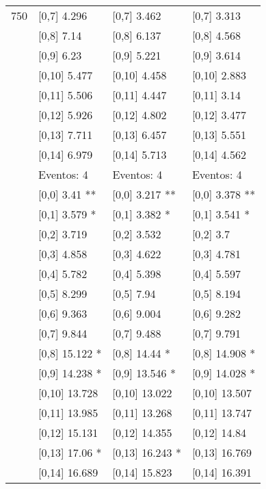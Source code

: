 \begin{table}
\begin{tabular}[t]{llll}
750 & {}[0,7] 4.296 & {}[0,7] 3.462 & {}[0,7] 3.313\\
\addlinespace
 & {}[0,8] 7.14 & {}[0,8] 6.137 & {}[0,8] 4.568\\
 & {}[0,9] 6.23 & {}[0,9] 5.221 & {}[0,9] 3.614\\
 & {}[0,10] 5.477 & {}[0,10] 4.458 & {}[0,10] 2.883\\
 & {}[0,11] 5.506 & {}[0,11] 4.447 & {}[0,11] 3.14\\
 & {}[0,12] 5.926 & {}[0,12] 4.802 & {}[0,12] 3.477\\
\addlinespace
 & {}[0,13] 7.711 & {}[0,13] 6.457 & {}[0,13] 5.551\\
 & {}[0,14] 6.979 & {}[0,14] 5.713 & {}[0,14] 4.562\\
 & Eventos:  4 & Eventos:  4 & Eventos:  4\\
 & {}[0,0] 3.41 ** & {}[0,0] 3.217 ** & {}[0,0] 3.378 **\\
 & {}[0,1] 3.579 * & {}[0,1] 3.382 * & {}[0,1] 3.541 *\\
\addlinespace
 & {}[0,2] 3.719 & {}[0,2] 3.532 & {}[0,2] 3.7\\
 & {}[0,3] 4.858 & {}[0,3] 4.622 & {}[0,3] 4.781\\
 & {}[0,4] 5.782 & {}[0,4] 5.398 & {}[0,4] 5.597\\
 & {}[0,5] 8.299 & {}[0,5] 7.94 & {}[0,5] 8.194\\
 & {}[0,6] 9.363 & {}[0,6] 9.004 & {}[0,6] 9.282\\
\addlinespace
1000 & {}[0,7] 9.844 & {}[0,7] 9.488 & {}[0,7] 9.791\\
 & {}[0,8] 15.122 * & {}[0,8] 14.44 * & {}[0,8] 14.908 *\\
 & {}[0,9] 14.238 * & {}[0,9] 13.546 * & {}[0,9] 14.028 *\\
 & {}[0,10] 13.728 & {}[0,10] 13.022 & {}[0,10] 13.507\\
 & {}[0,11] 13.985 & {}[0,11] 13.268 & {}[0,11] 13.747\\
\addlinespace
 & {}[0,12] 15.131 & {}[0,12] 14.355 & {}[0,12] 14.84\\
 & {}[0,13] 17.06 * & {}[0,13] 16.243 * & {}[0,13] 16.769\\
 & {}[0,14] 16.689 & {}[0,14] 15.823 & {}[0,14] 16.391\\
\bottomrule
\end{tabular}
\end{table}
